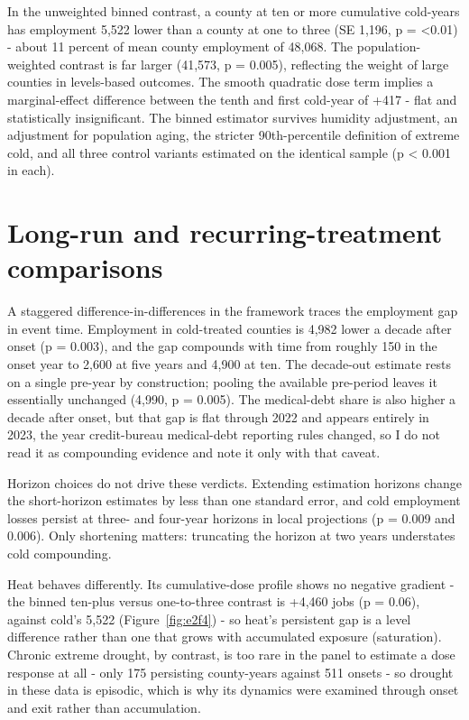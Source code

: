 \documentclass[a4paper,11pt]{report}
\begin{document}
In the unweighted binned contrast, a county at ten or more cumulative cold-years has employment 5,522 lower than a county at one to three (SE 1,196, p = <0.01) - about 11 percent of mean county employment of 48,068. The population-weighted contrast is far larger (\textminus{}41,573, p = 0.005), reflecting the weight of large counties in levels-based outcomes. The smooth quadratic dose term implies a marginal-effect difference between the tenth and first cold-year of +417 - flat and statistically insignificant. The binned estimator survives humidity adjustment, an adjustment for population aging, the stricter 90th-percentile definition of extreme cold, and all three control variants estimated on the identical sample (p < 0.001 in each).

\FloatBarrier
\section{Long-run and recurring-treatment comparisons}

A staggered difference-in-differences in the \citet{callaway2021did} framework traces the employment gap in event time. Employment in cold-treated counties is 4,982 lower a decade after onset (p = 0.003), and the gap compounds  with time from roughly 150 in the onset year to 2,600 at five years and 4,900 at ten. The decade-out estimate rests on a single pre-year by construction; pooling the available pre-period leaves it essentially unchanged (\textminus{}4,990, p = 0.005). The medical-debt share is also higher a decade after onset, but that gap is flat through 2022 and appears entirely in 2023, the year credit-bureau medical-debt reporting rules changed, so I do not read it as compounding evidence and note it only with that caveat.

Horizon choices do not drive these verdicts. Extending estimation horizons change the short-horizon estimates by less than one standard error, and cold employment losses persist at three- and four-year horizons in local projections (p = 0.009 and 0.006). Only shortening matters: truncating the horizon at two years understates cold compounding.

Heat behaves differently. Its cumulative-dose profile shows no negative gradient - the binned ten-plus versus one-to-three contrast is +4,460 jobs (p = 0.06), against cold's \textminus{}5,522 (Figure~\ref{fig:e2f4}) - so heat's persistent gap is a level difference rather than one that grows with accumulated exposure (saturation). Chronic extreme drought, by contrast, is too rare in the panel to estimate a dose response at all - only 175 persisting county-years against 511 onsets - so drought in these data is episodic, which is why its dynamics were examined through onset and exit rather than accumulation.
\end{document}
